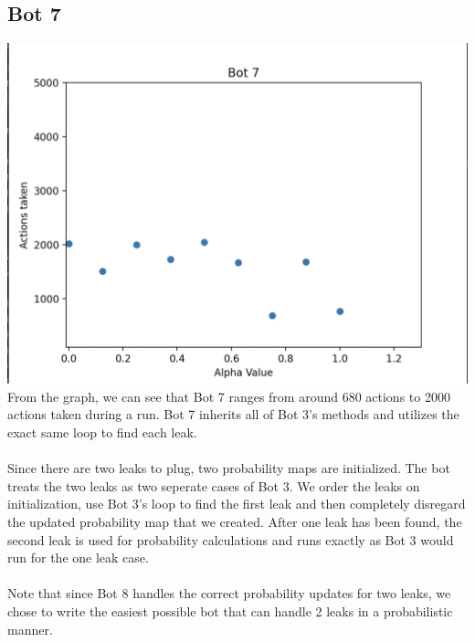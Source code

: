 \documentclass[12pt]{article}
\begin{document}
\subsection*{Bot 7}
\includegraphics*[scale=0.65]{Bot7}
From the graph, we can see that Bot 7 ranges from around 680 actions to 2000 actions taken during a run.
Bot 7 inherits all of Bot 3's methods and utilizes the exact same loop to find each leak. 
\\
\\
Since there are two leaks to plug, two probability maps are initialized. The bot treats the two leaks 
as two seperate cases of Bot 3. We order the leaks on initialization, use Bot 3's loop to find the first leak 
and then completely disregard the updated probability map that we created. After one leak has been found, 
the second leak is used for probability calculations and runs exactly as Bot 3 would run for the one leak case. 
\\
\\
Note that since Bot 8 handles the correct probability updates for two leaks, we chose to 
write the easiest possible bot that can handle 2 leaks in a probabilistic manner. 
\end{document}
